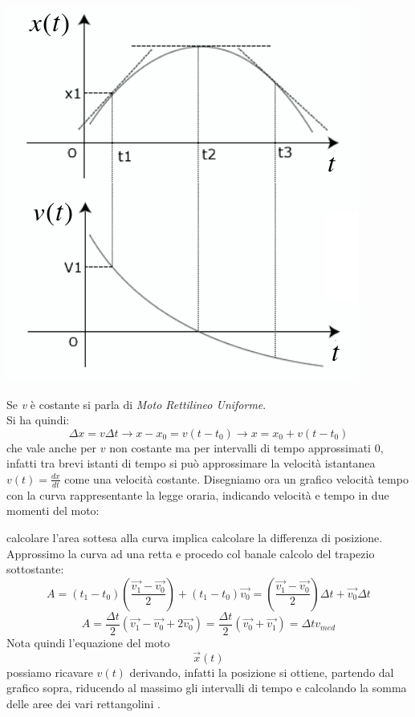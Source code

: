 \documentclass[a4paper,12pt, oneside]{book}
\begin{document}
\begin{center}
	\includegraphics[scale=0.36]{img/ist.png}
\end{center}
Se \textit{v} è costante si parla di \textit{Moto Rettilineo Uniforme}. \\
Si ha quindi:
$$\Delta x = v\Delta t\to x-x_0=v(t-t_0)\to x=x_0+v(t-t_0)$$
che vale anche per $v$ non costante ma per intervalli di tempo approssimati 0, infatti tra brevi istanti di tempo si può approssimare la velocità istantanea $v(t)=\frac{dx}{dt}$ come una velocità costante. Disegniamo ora un grafico velocità tempo con la curva rappresentante la legge oraria, indicando velocità e tempo in due momenti del moto:
\begin{center}
\end{center}
calcolare l'area sottesa alla curva implica calcolare la differenza di posizione. Approssimo la curva ad una retta e procedo col banale calcolo del trapezio sottostante:
$$A=(t_1-t_0)(\frac{\vec{v_1}-\vec{v_0}}{2})+(t_1-t_0
	)\vec{v_0}=(\frac{\vec{v_1}-\vec{v_0}}{2})\Delta t+\vec{v_0}\Delta t$$
$$A=\frac{\Delta t}{2}(\vec{v_1}-\vec{v_0}+2\vec{v_0})=\frac{\Delta t}{2}(\vec{v_0}+\vec{v_1})=\Delta t v_{med}$$
Nota quindi l'equazione del moto $$\vec{x}(t)$$ possiamo ricavare $v(t)$ derivando, infatti la posizione si ottiene, partendo dal grafico sopra, riducendo al massimo gli intervalli di tempo e calcolando la somma delle aree dei vari rettangolini .\\
\end{document}
